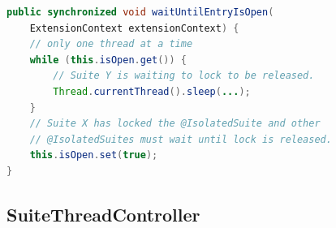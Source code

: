 \begin{lstlisting}[language=Java,label=isolatedsuite:sync,caption=Implementation of the @IsolatedSuite synchronisation mechanism,frame=tb]
public synchronized void waitUntilEntryIsOpen(
    ExtensionContext extensionContext) {
    // only one thread at a time
    while (this.isOpen.get()) {
        // Suite Y is waiting to lock to be released.
        Thread.currentThread().sleep(...);
    }
    // Suite X has locked the @IsolatedSuite and other
    // @IsolatedSuites must wait until lock is released.
    this.isOpen.set(true);
}
\end{lstlisting}

\subsection{SuiteThreadController}

